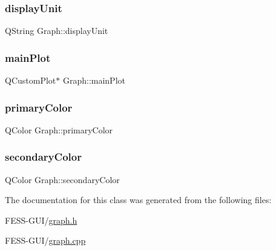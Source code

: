 \hypertarget{class_graph_a28488c31277fec31c8d54a44860efede}{}\label{class_graph_a28488c31277fec31c8d54a44860efede} 
\subsubsection{\texorpdfstring{display\+Unit}{displayUnit}}
{\footnotesize\ttfamily Q\+String Graph\+::display\+Unit\hspace{0.3cm}{\ttfamily [protected]}}

\hypertarget{class_graph_a02239013b745a7c1411a7f8623cc2073}{}\label{class_graph_a02239013b745a7c1411a7f8623cc2073} 
\subsubsection{\texorpdfstring{main\+Plot}{mainPlot}}
{\footnotesize\ttfamily Q\+Custom\+Plot$\ast$ Graph\+::main\+Plot\hspace{0.3cm}{\ttfamily [protected]}}

\hypertarget{class_graph_ab42ef887ac4d6bad01cc0c2c3609ab6b}{}\label{class_graph_ab42ef887ac4d6bad01cc0c2c3609ab6b} 
\subsubsection{\texorpdfstring{primary\+Color}{primaryColor}}
{\footnotesize\ttfamily Q\+Color Graph\+::primary\+Color}

\hypertarget{class_graph_a7bda51c2c124dfe46d5ee515a2508511}{}\label{class_graph_a7bda51c2c124dfe46d5ee515a2508511} 
\subsubsection{\texorpdfstring{secondary\+Color}{secondaryColor}}
{\footnotesize\ttfamily Q\+Color Graph\+::secondary\+Color}



The documentation for this class was generated from the following files\+:\begin{DoxyCompactItemize}
\item 
F\+E\+S\+S-\/\+G\+U\+I/\hyperlink{graph_8h}{graph.\+h}\item 
F\+E\+S\+S-\/\+G\+U\+I/\hyperlink{graph_8cpp}{graph.\+cpp}\end{DoxyCompactItemize}
